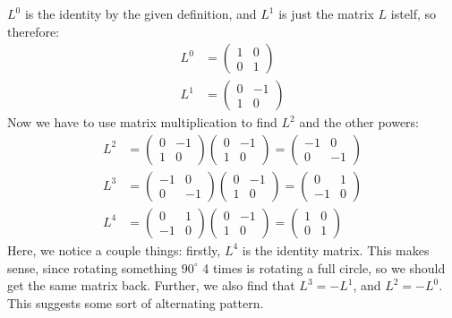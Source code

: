 \documentclass{article}
\begin{document}
\begin{solution}
	$L^0$ is the identity by the given definition, and $L^1$ is just the matrix $L$ istelf, so therefore: 
	\begin{align*}
		L^0 &= \begin{pmatrix} 1&0\\0&1 \end{pmatrix}  \\
		L^1 &= \begin{pmatrix} 0&-1\\1&0 \end{pmatrix} 
	\end{align*}
	Now we have to use matrix multiplication to find $L^2$ and the other powers: 
	\begin{align*}
		L^2 &= \begin{pmatrix} 0 & -1 \\ 1 & 0 \end{pmatrix} \begin{pmatrix} 0 & -1 \\1&0 \end{pmatrix} = \begin{pmatrix} -1 & 0 \\ 0 & -1 \end{pmatrix} \\
		L^3 &= \begin{pmatrix} -1 & 0 \\0 & -1 \end{pmatrix} \begin{pmatrix} 0 &-1 \\1 & 0 \end{pmatrix} = \begin{pmatrix} 0 & 1\\-1 & 0 \end{pmatrix}  \\
		L^4 &= \begin{pmatrix} 0 & 1\\-1&0 \end{pmatrix} \begin{pmatrix} 0 & -1 \\ 1 & 0 \end{pmatrix} = \begin{pmatrix} 1 & 0\\0&1 \end{pmatrix} 
	\end{align*}
	Here, we notice a couple things: firstly, $L^4$ is the identity matrix. This makes sense, since rotating 
	something $90^\circ$ 4 times is rotating a full circle, so we should get the same matrix back. Further, we 
	also find that $L^3 = -L^1$, and $L^2 = -L^0$. This suggests some sort of alternating pattern.
\end{solution}
\end{document}
